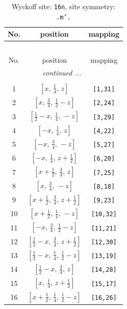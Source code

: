 \documentclass[fleqn,8pt]{jsarticle}
\begin{document}
\renewcommand{\arraystretch}{1.2}
\begin{longtable}{ccc}
\caption{Wyckoff site: {\tt 16n}, site symmetry: {\tt .m'.}}
 \\
 \hline \hline
No. & position & mapping \\ \hline \endfirsthead

\multicolumn{2}{l}{\tablename\ \thetable{}} \\
 \hline \hline
No. & position & mapping \\ \hline \endhead

 \hline \hline
\multicolumn{2}{r}{\footnotesize\it continued ...} \\ \endfoot

 \hline \hline
\multicolumn{2}{r}{} \\ \endlastfoot

1 & $\left[ x,\, \frac{1}{4},\, z \right]$ & {\tt [1,31]} \\ \hline
2 & $\left[ x,\, \frac{3}{4},\, \frac{1}{2} - z \right]$ & {\tt [2,24]} \\ \hline
3 & $\left[ \frac{1}{2} - x,\, \frac{1}{4},\, - z \right]$ & {\tt [3,29]} \\ \hline
4 & $\left[ - x,\, \frac{1}{4},\, z \right]$ & {\tt [4,22]} \\ \hline
5 & $\left[ - x,\, \frac{3}{4},\, - z \right]$ & {\tt [5,27]} \\ \hline
6 & $\left[ - x,\, \frac{1}{4},\, z + \frac{1}{2} \right]$ & {\tt [6,20]} \\ \hline
7 & $\left[ x + \frac{1}{2},\, \frac{3}{4},\, z \right]$ & {\tt [7,25]} \\ \hline
8 & $\left[ x,\, \frac{3}{4},\, - z \right]$ & {\tt [8,18]} \\ \hline
9 & $\left[ x + \frac{1}{2},\, \frac{3}{4},\, z + \frac{1}{2} \right]$ & {\tt [9,23]} \\ \hline
10 & $\left[ x + \frac{1}{2},\, \frac{1}{4},\, - z \right]$ & {\tt [10,32]} \\ \hline
11 & $\left[ - x,\, \frac{3}{4},\, \frac{1}{2} - z \right]$ & {\tt [11,21]} \\ \hline
12 & $\left[ \frac{1}{2} - x,\, \frac{3}{4},\, z + \frac{1}{2} \right]$ & {\tt [12,30]} \\ \hline
13 & $\left[ \frac{1}{2} - x,\, \frac{1}{4},\, \frac{1}{2} - z \right]$ & {\tt [13,19]} \\ \hline
14 & $\left[ \frac{1}{2} - x,\, \frac{3}{4},\, z \right]$ & {\tt [14,28]} \\ \hline
15 & $\left[ x,\, \frac{1}{4},\, z + \frac{1}{2} \right]$ & {\tt [15,17]} \\ \hline
16 & $\left[ x + \frac{1}{2},\, \frac{1}{4},\, \frac{1}{2} - z \right]$ & {\tt [16,26]} \\
\end{longtable}
\end{document}
